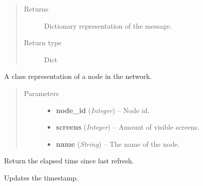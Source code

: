 \documentclass[letterpaper,10pt,english]{sphinxmanual}
\begin{document}
\begin{fulllineitems}
\begin{fulllineitems}
\begin{quote}
\begin{description}
\item[{Returns}] \leavevmode
Dictionary representation of the message.

\item[{Return type}] \leavevmode
Dict

\end{description}\end{quote}

\end{fulllineitems}


\end{fulllineitems}


\begin{fulllineitems}
\label{swnp:swnp.Node}
A class representation of a node in the network.
\begin{quote}\begin{description}
\item[{Parameters}] \leavevmode\begin{itemize}
\item {} 
\textbf{node\_id} (\emph{Integer}) -- Node id.

\item {} 
\textbf{screens} (\emph{Integer}) -- Amount of visible screens.

\item {} 
\textbf{name} (\emph{String}) -- The name of the node.

\end{itemize}

\end{description}\end{quote}

\begin{fulllineitems}
\label{swnp:swnp.Node.get_age}
Return the elapsed time since last refresh.

\end{fulllineitems}


\begin{fulllineitems}
\label{swnp:swnp.Node.refresh}
Updates the timestamp.

\end{fulllineitems}


\end{fulllineitems}
\end{document}
